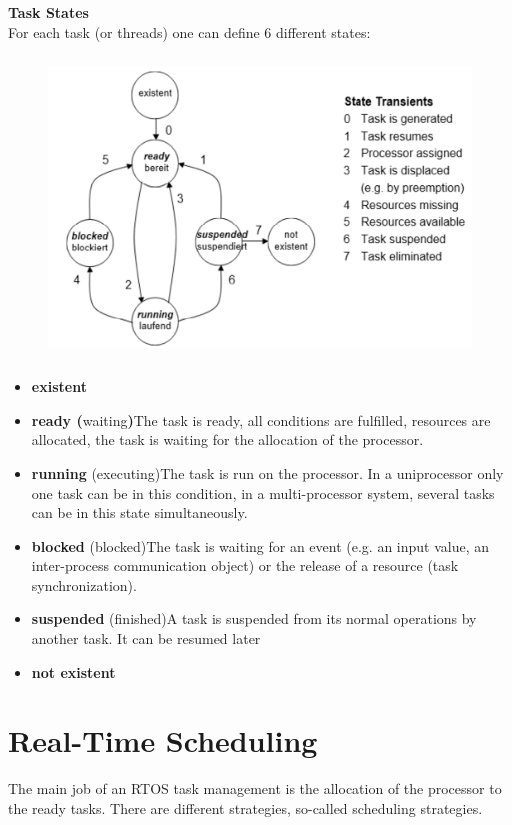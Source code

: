 {\rot\bf Task States}\\

For each task (or threads) one can define 6 different states:

	\begin{figure}[h]
    \centering
    \includegraphics[width=13cm, height=8cm]{Images/image82.png}
    \label{fig:Fig 28}
    \end{figure}
\os{\newpage}
\begin{itemize}
	\item  \textbf{existent}
	\item \textbf{ ready (}waiting\textbf{)}The task is ready, all conditions are fulfilled, resources are allocated, the task is waiting for the allocation of the processor.
	\item  \textbf{running }(executing)The task is run on the processor. In a uniprocessor only one task can be in this condition, in a multi-processor system, several tasks can be in this state simultaneously. 
	\item  \textbf{blocked} (blocked)The task is waiting for an event (e.g. an input value, an inter-process communication object) or the release of a resource (task synchronization). 
	\item  \textbf{suspended }(finished)A task is suspended from its normal operations by another task. It can be resumed later
	\item  \textbf{not existent}
\end{itemize}

\section{Real-Time Scheduling}

The main job of an RTOS task management is the allocation of the processor to the ready tasks. There are different strategies, so-called scheduling strategies.\\

